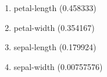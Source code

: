 \begin{enumerate}
\item petal-length (0.458333)
\item petal-width (0.354167)
\item sepal-length (0.179924)
\item sepal-width (0.00757576)
\end{enumerate}